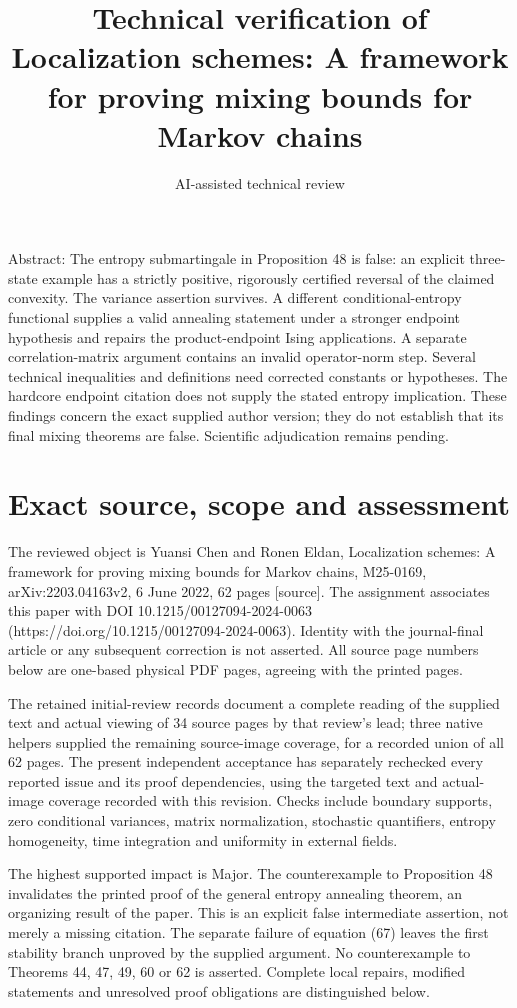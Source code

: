 \documentclass[10pt]{article}
\title{Technical verification of Localization schemes: A framework for proving mixing bounds for Markov chains}
\author{AI-assisted technical review}
\date{}
\begin{document}
\maketitle
Abstract: The entropy submartingale in Proposition 48 is false: an explicit three-state example has a strictly positive, rigorously certified reversal of the claimed convexity. The variance assertion survives. A different conditional-entropy functional supplies a valid annealing statement under a stronger endpoint hypothesis and repairs the product-endpoint Ising applications. A separate correlation-matrix argument contains an invalid operator-norm step. Several technical inequalities and definitions need corrected constants or hypotheses. The hardcore endpoint citation does not supply the stated entropy implication. These findings concern the exact supplied author version; they do not establish that its final mixing theorems are false. Scientific adjudication remains pending.\par
\section*{Exact source, scope and assessment}
The reviewed object is Yuansi Chen and Ronen Eldan, Localization schemes: A framework for proving mixing bounds for Markov chains, M25-0169, arXiv:2203.04163v2, 6 June 2022, 62 pages [source]. The assignment associates this paper with DOI 10.1215/00127094-2024-0063 (https://doi.org/10.1215/00127094-2024-0063). Identity with the journal-final article or any subsequent correction is not asserted. All source page numbers below are one-based physical PDF pages, agreeing with the printed pages.\par
The retained initial-review records document a complete reading of the supplied text and actual viewing of 34 source pages by that review’s lead; three native helpers supplied the remaining source-image coverage, for a recorded union of all 62 pages. The present independent acceptance has separately rechecked every reported issue and its proof dependencies, using the targeted text and actual-image coverage recorded with this revision. Checks include boundary supports, zero conditional variances, matrix normalization, stochastic quantifiers, entropy homogeneity, time integration and uniformity in external fields.\par
The highest supported impact is Major. The counterexample to Proposition 48 invalidates the printed proof of the general entropy annealing theorem, an organizing result of the paper. This is an explicit false intermediate assertion, not merely a missing citation. The separate failure of equation (67) leaves the first stability branch unproved by the supplied argument. No counterexample to Theorems 44, 47, 49, 60 or 62 is asserted. Complete local repairs, modified statements and unresolved proof obligations are distinguished below.\par
\end{document}
